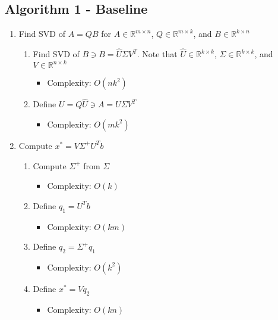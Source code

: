 \documentclass{article}[11pt]
\begin{document}
   \subsection{Algorithm 1 - Baseline}
   \begin{enumerate}
   \item Find SVD of $A = QB$ for $A \in \mathbb{R}^{m \times n}$, $Q \in \mathbb{R}^{m \times k}$, and $B \in \mathbb{R}^{k \times n}$
   		\begin{enumerate}
   		\item Find SVD of $B \ni B = \hat{U}\Sigma V^T$. Note that $\hat{U} \in \mathbb{R}^{k \times k}$, $\Sigma \in \mathbb{R}^{k \times k}$, and $V \in \mathbb{R}^{n \times k}$
   			\begin{itemize}
   			\item Complexity: $O(nk^2)$
   			\end{itemize}
   		\item Define $U = Q\hat{U} \ni A = U \Sigma V^T$ 
   			\begin{itemize}
   			\item Complexity: $O(m k^2)$
   			\end{itemize}
   		\end{enumerate}
   \item Compute $x^* = V \Sigma^{+} U^T b$
   		\begin{enumerate}
   		\item Compute $\Sigma^{+}$ from $\Sigma$
   			\begin{itemize}
   			\item Complexity: $O(k)$
   			\end{itemize}
   		\item Define $q_1 = U^{T}b$ 
   			\begin{itemize}
   			\item Complexity: $O(km)$
   			\end{itemize}
   		\item Define $q_2 = \Sigma^{+}q_1$ 
   			\begin{itemize}
   			\item Complexity: $O(k^2)$
   			\end{itemize}
   		\item Define $x^* = Vq_2$ 
   			\begin{itemize}
   			\item Complexity: $O(kn)$
   			\end{itemize}
   		\end{enumerate}
   \end{enumerate}
   
\end{document}
